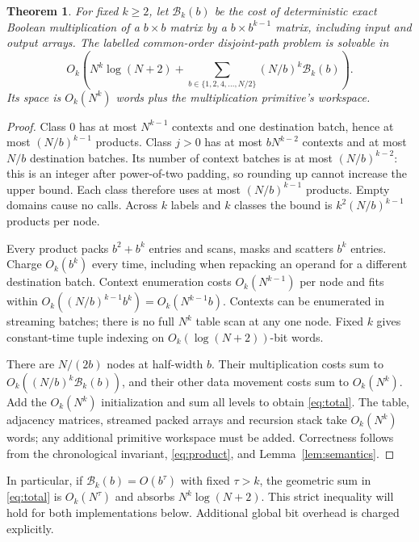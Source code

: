 \documentclass[acmlarge,11pt,screen,nonacm]{acmart}
\newtheorem{theorem}{Theorem}[section]
\begin{document}
\begin{samepage}
\begin{theorem}\label{thm:primitive}
For fixed $k\geq2$, let $\mathcal B_k(b)$ be the cost of deterministic exact
Boolean multiplication of a $b\times b$ matrix by a $b\times b^{k-1}$ matrix,
including input and output arrays. The labelled common-order disjoint-path
problem is solvable in
\begin{equation}\label{eq:total}
 O_k\left(N^k\log(N+2)+
 \sum_{b\in\{1,2,4,\ldots,N/2\}}(N/b)^k\mathcal B_k(b)\right).
\end{equation}
Its space is $O_k(N^k)$ words plus the multiplication primitive's workspace.
\end{theorem}
\end{samepage}
\begin{proof}
Class $0$ has at most $N^{k-1}$ contexts and one destination batch, hence
at most $(N/b)^{k-1}$ products. Class $j>0$ has at most $bN^{k-2}$ contexts
and at most $N/b$ destination batches. Its number of context batches is at
most $(N/b)^{k-2}$: this is an integer after power-of-two padding, so rounding
up cannot increase the upper bound. Each class therefore uses at most
$(N/b)^{k-1}$ products. Empty domains cause no calls. Across $k$ labels and
$k$ classes the bound is $k^2(N/b)^{k-1}$ products per node.

Every product packs $b^2+b^k$ entries and scans, masks and scatters $b^k$
entries. Charge $O_k(b^k)$ every time, including when repacking an operand
for a different destination batch. Context enumeration costs
$O_k(N^{k-1})$ per node and fits within
$O_k((N/b)^{k-1}b^k)=O_k(N^{k-1}b)$. Contexts can be enumerated in streaming
batches; there is no full $N^k$ table scan at any one node. Fixed $k$ gives
constant-time tuple indexing on $O_k(\log(N+2))$-bit words.

There are $N/(2b)$ nodes at half-width $b$. Their multiplication costs sum
to $O_k((N/b)^k\mathcal B_k(b))$, and their other data movement costs sum
to $O_k(N^k)$. Add the $O_k(N^k)$ initialization and sum all levels to obtain
\eqref{eq:total}. The table, adjacency matrices, streamed packed arrays and
recursion stack take $O_k(N^k)$ words; any additional primitive workspace
must be added. Correctness follows from the chronological invariant,
\eqref{eq:product}, and Lemma~\ref{lem:semantics}.
\end{proof}

In particular, if $\mathcal B_k(b)=O(b^\tau)$ with fixed $\tau>k$, the
geometric sum in \eqref{eq:total} is $O_k(N^\tau)$ and absorbs
$N^k\log(N+2)$. This strict inequality will hold for both implementations
below. Additional global bit overhead is charged explicitly.
\end{document}
